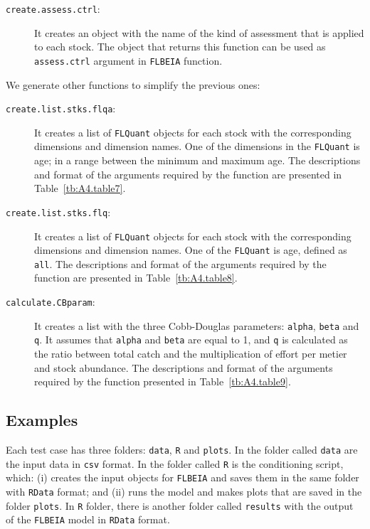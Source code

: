 \begin{description}
  \item[\texttt{create.assess.ctrl}:] It creates an object with the name of the kind of assessment that is applied to each stock. The object that returns this function can be used as \texttt{assess.ctrl} argument in \texttt{FLBEIA} function.
\end{description}

We generate other functions to simplify the previous ones:

\begin{description}
  \item[\texttt{create.list.stks.flqa}:] It creates a list of \texttt{FLQuant} objects for each stock with the corresponding dimensions and dimension names. One of the dimensions in the \texttt{FLQuant} is age; in a range between the minimum and maximum age. The descriptions and format of the arguments required by the function are presented in Table~\ref{tb:A4.table7}.
\end{description}

\begin{description}
  \item[\texttt{create.list.stks.flq}:] It creates a list of \texttt{FLQuant} objects for each stock with the corresponding dimensions and dimension names. One of the \texttt{FLQuant} is age, defined as \texttt{all}. The descriptions and format of the arguments required by the function are presented in Table~\ref{tb:A4.table8}.
\end{description}

\begin{description}
  \item[\texttt{calculate.CBparam}:] It creates a list with the three Cobb-Douglas parameters: \texttt{alpha}, \texttt{beta} and \texttt{q}. It assumes that \texttt{alpha} and \texttt{beta} are equal to 1, and \texttt{q} is calculated as the ratio between total catch and the multiplication of effort per metier and stock abundance. The descriptions and format of the arguments required by the function presented in Table~\ref{tb:A4.table9}.
\end{description}

\subsection{Examples}  \label{sec:SmartCondEx}

Each test case has three folders: \texttt{data}, \texttt{R} and \texttt{plots}. In the folder called \texttt{data} are the input data in \texttt{csv} format. In the folder called \texttt{R} is the conditioning script, which: (i) creates the input objects for \texttt{FLBEIA} and saves them in the same folder with \texttt{RData} format; and (ii) runs the model and makes plots that are saved in the folder \texttt{plots}. In \texttt{R} folder, there is another folder called \texttt{results} with the output of the \texttt{FLBEIA} model in \texttt{RData} format.

